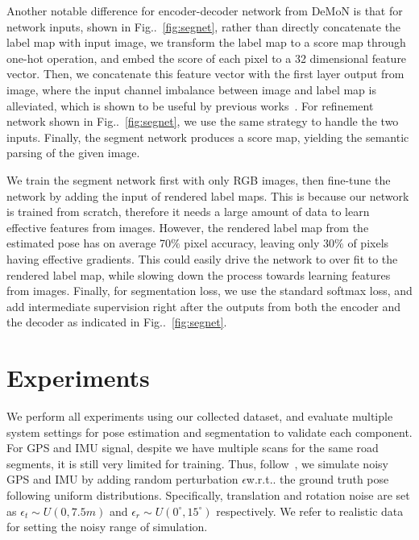 \documentclass[10pt,twocolumn,letterpaper]{article}
\makeatletter
\newcommand{\figref}[1]{Fig\onedot~\ref{#1}}
\DeclareRobustCommand\onedot{\futurelet\@let@token\@onedot}
\def\onedot{\ifx\@let@token.\else.\null\fi\xspace}
\def\wrt{w.r.t\onedot}
\makeatother
\begin{document}
Another notable difference for encoder-decoder network from DeMoN is that for network inputs, shown in \figref{fig:segnet}, rather than directly concatenate the label map with input image, we transform the label map to a score map through one-hot operation, and embed the score of each pixel to a 32 dimensional feature vector. 
Then, we concatenate this feature vector with the first layer output from image, where the input channel imbalance between image and label map is alleviated, which is shown to be useful by previous works~\cite{eigen2015predicting}.
 For refinement network shown in \figref{fig:segnet}, we use the same strategy to handle the two inputs. 
 Finally, the segment network produces a score map, yielding the semantic parsing of the given image.

We train the segment network first with only RGB images, then fine-tune the network by adding the input of rendered label maps. This is because our network is trained from scratch, therefore it needs a large amount of data to learn effective features from images. However, the rendered label map from the estimated pose has on average 70$\%$ pixel accuracy, leaving only 30$\%$ of pixels having effective gradients. This could easily drive the network to over fit to the rendered label map, while slowing down the process towards learning features from images. Finally, for segmentation loss, we use the standard softmax loss, and add intermediate supervision right after the outputs from both the encoder and the decoder as indicated in \figref{fig:segnet}. 


\vspace{-1.0\baselineskip}\section{Experiments}\vspace{-0.4\baselineskip}\label{sec:experiments}
We perform all experiments using our collected dataset, and evaluate multiple system settings for pose estimation and segmentation to validate each component.
For GPS and IMU signal, despite we have multiple scans for the same road segments, it is still very limited for training. Thus, follow~\cite{vishal2015accurate}, we simulate noisy GPS and IMU by adding random perturbation $\epsilon$\wrt the ground truth pose following uniform distributions. 
Specifically, translation and rotation noise are set as $\epsilon_t \sim U(0, 7.5m)$ and $\epsilon_r \sim U(0^{\circ}, 15^{\circ})$ respectively. 
We refer to realistic data~\cite{lee2015gps} for setting the noisy range of simulation.
\end{document}
